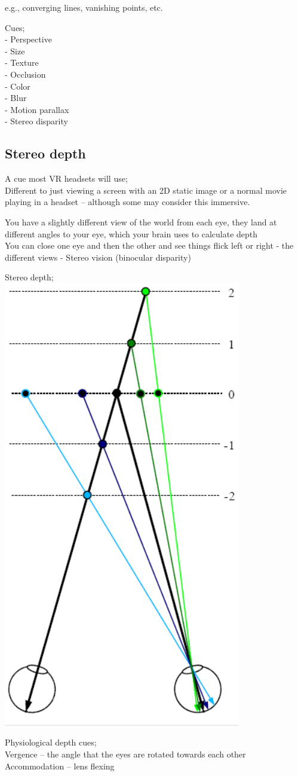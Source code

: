 \documentclass[]{project_plan}
\begin{document}
e.g., converging lines, vanishing points, etc.

Cues;\\
- Perspective\\
- Size\\
- Texture\\
- Occlusion\\
- Color\\
- Blur\\
- Motion parallax\\
- Stereo disparity

\subsection{Stereo depth}

A cue most VR headsets will use;\\
Different to just viewing a screen with
an 2D static image or a normal movie
playing in a headset – although some
may consider this immersive.

You have a slightly different view of the world from each eye, they land at different angles to your eye, which your brain uses to calculate depth\\
You can close one eye and then the other and see things flick left or right - the different views - Stereo vision (binocular disparity)

\newpage

Stereo depth;\\
\includegraphics[width=0.4\linewidth]{stereo_depth.png}

Physiological depth cues;\\
Vergence – the angle that the eyes are rotated towards each other\\
Accommodation – lens flexing
\end{document}
